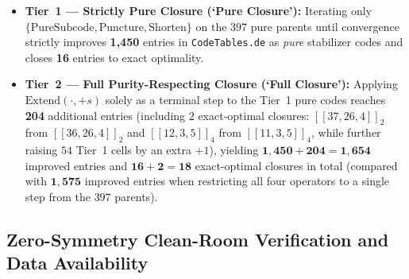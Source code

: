 \documentclass[11pt,a4paper]{article}
\theoremstyle{remark}
\begin{document}
\begin{itemize}\small
  \item \textbf{Tier~1 --- Strictly Pure Closure (`Pure Closure'):} Iterating only $\{\mathrm{PureSubcode},\allowbreak \mathrm{Puncture},\allowbreak \mathrm{Shorten}\}$ on the $397$ pure parents until convergence strictly improves \textbf{1,450} entries in \texttt{CodeTables.de} as \emph{pure} stabilizer codes and closes \textbf{16} entries to exact optimality.
  \item \textbf{Tier~2 --- Full Purity-Respecting Closure (`Full Closure'):} Applying $\mathrm{Extend}(\cdot, +s)$ solely as a terminal step to the Tier~1 pure codes reaches \textbf{204} additional entries (including $2$ exact-optimal closures: $[[37,26,4]]_2$ from $[[36,26,4]]_2$ and $[[12,3,5]]_4$ from $[[11,3,5]]_4$, while further raising $54$ Tier~1 cells by an extra $+1$), yielding $\mathbf{1{,}450 + 204 = 1{,}654}$ improved entries and $\mathbf{16 + 2 = 18}$ exact-optimal closures in total (compared with $\mathbf{1{,}575}$ improved entries when restricting all four operators to a single step from the $397$ parents).
\end{itemize}

\subsection{Zero-Symmetry Clean-Room Verification and Data Availability}
\end{document}
